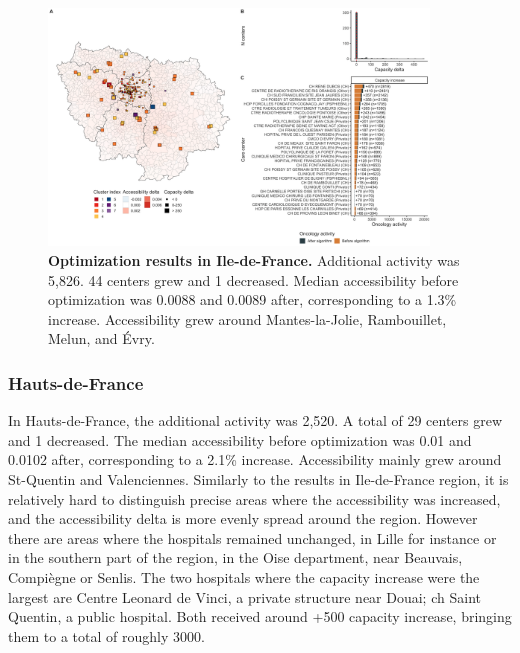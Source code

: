 \begin{figure}[h!]
    \includegraphics[width=0.9\textwidth]{images/camion/optim_region/optim_Ile-de-France.png}
    \centering
    \caption{ \textbf{Optimization results in Ile-de-France.} Additional
        activity was 5,826. 44 centers grew and 1 decreased. Median
        accessibility before optimization was 0.0088 and 0.0089 after,
        corresponding to a 1.3\% increase. Accessibility grew around
        Mantes-la-Jolie, Rambouillet, Melun, and Évry. }
\end{figure}

\subsubsection{Hauts-de-France}

In Hauts-de-France, the additional activity was 2,520. A total of 29 centers
grew and 1 decreased. The median accessibility before optimization was 0.01 and
0.0102 after, corresponding to a 2.1\% increase. Accessibility mainly grew
around St-Quentin and Valenciennes. Similarly to the results in Ile-de-France
region, it is relatively hard to distinguish precise areas where the accessibility
was increased, and the accessibility delta is more evenly spread around the region.
However there are areas where the hospitals remained unchanged, in Lille for instance or
in the southern part of the region, in the Oise department, near Beauvais,
Compiègne or Senlis. The two hospitals where the capacity increase were the
largest are Centre Leonard de Vinci, a private structure near Douai; \ac{ch}
Saint Quentin, a public hospital. Both received around +500 capacity increase,
bringing them to a total of roughly 3000.

